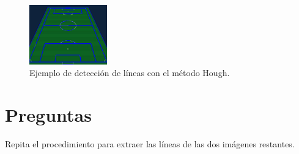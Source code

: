 \begin{figure}[H]
    \centering
    \includegraphics[width=0.3\textwidth]{Lab_3/template/figures/football_lines.png}
    \caption{Ejemplo de detección de líneas con el método Hough.}
    \label{fig:ejemplo_hough}
\end{figure}


\section*{Preguntas}

\vspace{5mm}
\begin{tcolorbox}[colback=gray!10, colframe=gray!30, coltitle=black, title=Pregunta B.1, halign=left]
Repita el procedimiento para extraer las líneas de las dos imágenes restantes.
\end{tcolorbox}